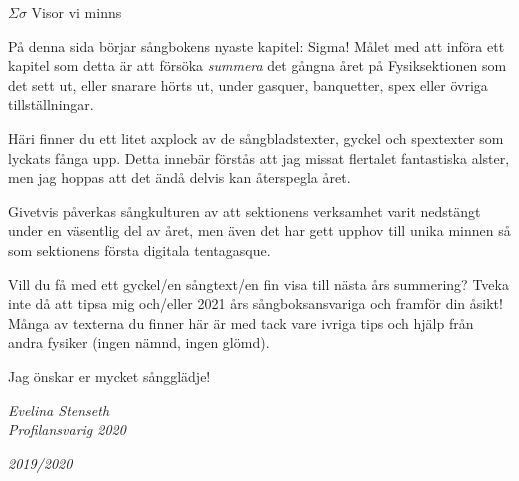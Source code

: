 \documentclass[a6paper,10pt]{article}
\begin{document}
\noindent
\huge{$\Sigma\sigma$ Visor vi minns}
\vspace{10pt}

\noindent
\small
På denna sida börjar sångbokens nyaste kapitel: Sigma! Målet med att införa ett kapitel som detta är att försöka \textit{summera} det gångna året på Fysiksektionen som det sett ut, eller snarare hörts ut, under gasquer, banquetter, spex eller övriga tillställningar. 

Häri finner du ett litet axplock av de sångbladstexter, gyckel och spextexter som lyckats fånga upp. Detta innebär förstås att jag missat flertalet fantastiska alster, men jag hoppas att det ändå delvis  kan återspegla året.

Givetvis påverkas sångkulturen av att sektionens verksamhet varit nedstängt under en väsentlig del av året, men även det har gett upphov till unika minnen så som sektionens första digitala tentagasque.

Vill du få med ett gyckel/en sångtext/en fin visa till nästa års summering? Tveka inte då att tipsa mig och/eller 2021 års sångboksansvariga och framför din åsikt! Många av texterna du finner här är med tack vare ivriga tips och hjälp från andra fysiker (ingen nämnd, ingen glömd). 

Jag önskar er mycket sångglädje! 
\begin{flushright}
\textit{Evelina Stenseth \\Profilansvarig 2020}
\end{flushright}
\setlength{\oddsidemargin}{-0.47in}

\begin{center}
\huge \textit{2019/2020}
\end{center}
\end{document}
